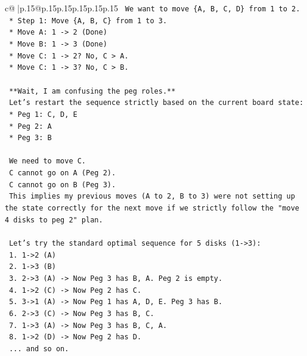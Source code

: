\documentclass{article}
\begin{document}
{\begin{supertabular}{c@{$\;$}|p{.15\linewidth}@{}p{.15\linewidth}p{.15\linewidth}p{.15\linewidth}p{.15\linewidth}p{.15\linewidth}}
{{{\texttt{        We want to move \{A, B, C, D\} from 1 to 2.} \\
\texttt{        *   Step 1: Move \{A, B, C\} from 1 to 3.} \\
\texttt{            *   Move A: 1 {-}> 2 (Done)} \\
\texttt{            *   Move B: 1 {-}> 3 (Done)} \\
\texttt{            *   Move C: 1 {-}> 2? No, C > A.} \\
\texttt{            *   Move C: 1 {-}> 3? No, C > B.} \\
\\ 
\texttt{        **Wait, I am confusing the peg roles.**} \\
\texttt{        Let's restart the sequence strictly based on the current board state:} \\
\texttt{        *   Peg 1: C, D, E} \\
\texttt{        *   Peg 2: A} \\
\texttt{        *   Peg 3: B} \\
\\ 
\texttt{        We need to move C.} \\
\texttt{        C cannot go on A (Peg 2).} \\
\texttt{        C cannot go on B (Peg 3).} \\
\texttt{        This implies my previous moves (A to 2, B to 3) were not setting up the state correctly for the next move if we strictly follow the "move 4 disks to peg 2" plan.} \\
\\ 
\texttt{        Let's try the standard optimal sequence for 5 disks (1{-}>3):} \\
\texttt{        1. 1{-}>2 (A)} \\
\texttt{        2. 1{-}>3 (B)} \\
\texttt{        3. 2{-}>3 (A) {-}> Now Peg 3 has B, A. Peg 2 is empty.} \\
\texttt{        4. 1{-}>2 (C) {-}> Now Peg 2 has C.} \\
\texttt{        5. 3{-}>1 (A) {-}> Now Peg 1 has A, D, E. Peg 3 has B.} \\
\texttt{        6. 2{-}>3 (C) {-}> Now Peg 3 has B, C.} \\
\texttt{        7. 1{-}>3 (A) {-}> Now Peg 3 has B, C, A.} \\
\texttt{        8. 1{-}>2 (D) {-}> Now Peg 2 has D.} \\
\texttt{        ... and so on.} \\
}}}
\end{supertabular}}
\end{document}
